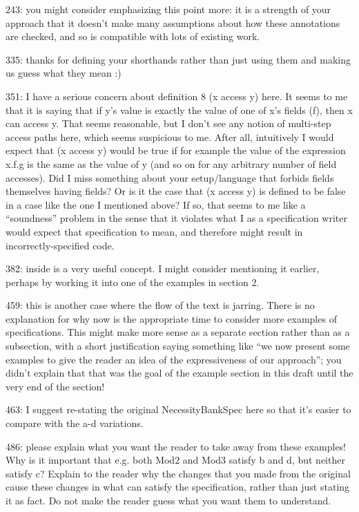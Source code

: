 \documentclass[11pt]{amsart}
\begin{document}
243: you might consider emphasizing this point more: it is a strength of your approach that it doesn’t make many assumptions about how these annotations are checked, and so is compatible with lots of existing work.

335: thanks for defining your shorthands rather than just using them and making us guess what they mean :)

351: I have a serious concern about definition 8 (x access y) here. It seems to me that it is saying that if y’s value is exactly the value of one of x’s fields (f), then x can access y. That seems reasonable, but I don’t see any notion of multi-step access paths here, which seems suspicious to me. After all, intuitively I would expect that (x access y) would be true if for example the value of the expression x.f.g is the same as the value of y (and so on for any arbitrary number of field accesses). Did I miss something about your setup/language that forbids fields themselves having fields? Or is it the case that (x access y) is defined to be false in a case like the one I mentioned above? If so, that seems to me like a “soundness” problem in the sense that it violates what I as a specification writer would expect that specification to mean, and therefore might result in incorrectly-specified code.

382: inside is a very useful concept. I might consider mentioning it earlier, perhaps by working it into one of the examples in section 2.

459: this is another case where the flow of the text is jarring. There is no explanation for why now is the appropriate time to consider more examples of specifications. This might make more sense as a separate section rather than as a subsection, with a short justification saying something like “we now present some examples to give the reader an idea of the expressiveness of our approach”; you didn’t explain that that was the goal of the example section in this draft until the very end of the section!

463: I suggest re-stating the original NecessityBankSpec here so that it’s easier to compare with the a-d variations.

486: please explain what you want the reader to take away from these examples! Why is it important that e.g. both Mod2 and Mod3 satisfy b and d, but neither satisfy c? Explain to the reader why the changes that you made from the original cause these changes in what can satisfy the specification, rather than just stating it as fact. Do not make the reader guess what you want them to understand.
\end{document}

